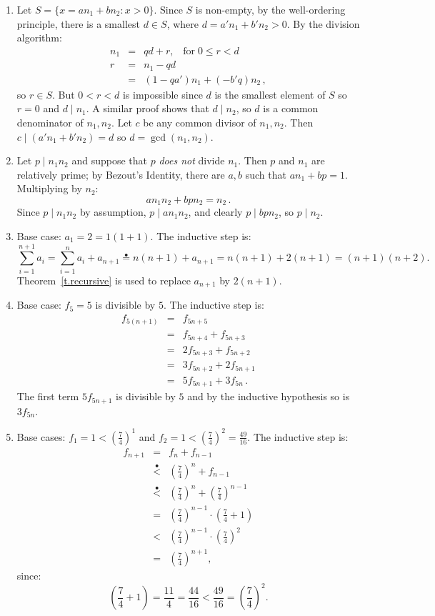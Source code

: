 \documentclass[11pt,a4paper]{report}
\newcommand*{\ih}{\stackrel{\bullet}{=}}
\newcommand*{\ihlt}{\stackrel{\bullet}{<}}
\begin{document}
\begin{enumerate}
\item Let $S=\{x = an_1+bn_2: x>0\}$. Since $S$ is non-empty, by the well-ordering principle, there is a smallest $d\in S$, where $d=a'n_1+b'n_2>0$. By the division algorithm:
\vspace*{-6pt}
\begin{eqnarray*}
n_1&=&qd+r,\;\;\; \mathrm{for}\;0\leq r < d\\
r &=& n_1-qd\\
&=& (1-qa')n_1+(-b'q)n_2\,,
\end{eqnarray*}
so $r\in S$. But $0<r<d$ is impossible since $d$ is the smallest element of $S$ so $r=0$ and $d\mid n_1$. A similar proof shows that $d\mid n_2$, so $d$ is a common denominator of $n_1,n_2$. Let $c$ be any common divisor of $n_1, n_2$. Then $c\mid (a'n_1+b'n_2)=d$ so $d=\gcd(n_1,n_2)$.

\item Let $p \mid n_1n_2$ and suppose that $p$ \emph{does not} divide $n_1$. Then $p$ and $n_1$ are relatively prime; by Bezout's Identity, there are $a,b$ such that $an_1+bp=1$. Multiplying by $n_2$:
\[
an_1n_2 + bpn_2 = n_2\,.
\]
Since $p \mid n_1n_2$ by assumption, $p \mid an_1n_2$, and clearly $p \mid bpn_2$, so $p\mid n_2$.

\item Base case: $a_1=2=1(1+1)$. The inductive step is:
\[
\sum_{i=1}^{n+1}a_i=\sum_{i=1}^n a_i+a_{n+1}\ih{}n(n+1)+a_{n+1}=n(n+1)+2(n+1)=(n+1)(n+2).
\]
Theorem~\ref{t.recursive} is used to replace $a_{n+1}$ by $2(n+1)$.

\item Base case: $f_5=5$ is divisible by $5$. The inductive step is:
\begin{eqnarray*}
f_{5(n+1)} &=& f_{5n+5}\\
&=& f_{5n+4}+f_{5n+3}\\
&=& 2f_{5n+3}+f_{5n+2}\\
&=& 3f_{5n+2}+2f_{5n+1}\\
&=& 5f_{5n+1}+3f_{5n}\,.
\end{eqnarray*}
The first term $5f_{5n+1}$ is divisible by $5$ and by the inductive hypothesis so is $3f_{5n}$.

\item Base cases: $f_1=1<(\frac{7}{4})^1$ and $f_2=1<(\frac{7}{4})^2=\frac{49}{16}$. The inductive step is:
\begin{eqnarray*}
f_{n+1}&=&f_n+f_{n-1}\\
&\ihlt{}&\left(\frac{7}{4}\right)^n + f_{n-1}\\
&\ihlt{}&\left(\frac{7}{4}\right)^n + \left(\frac{7}{4}\right)^{n-1}\\
&=&\left(\frac{7}{4}\right)^{n-1}\cdot\left(\frac{7}{4}+1\right)\\
&<&\left(\frac{7}{4}\right)^{n-1}\cdot\left(\frac{7}{4}\right)^2\\
&=&\left(\frac{7}{4}\right)^{n+1},
\end{eqnarray*}
since:
\[
\left(\frac{7}{4}+1\right) = \frac{11}{4} = \frac{44}{16}<\frac{49}{16}=\left(\frac{7}{4}\right)^2.
\]


\end{enumerate}
\end{document}
